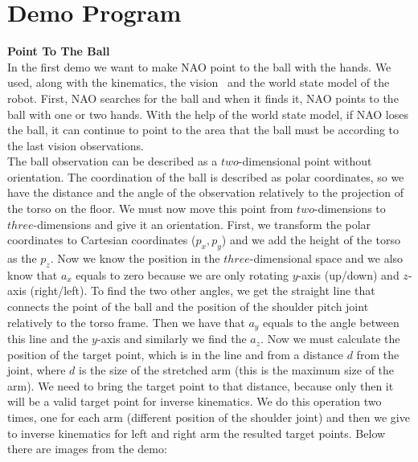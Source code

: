 \section{Demo Program}
\textbf{Point To The Ball}\\
In the first demo we want to make NAO point to the ball with the hands. We used, along with the kinematics, the vision~\cite{orfanoudakis2011} and the world state model of the robot. First, NAO searches for the ball and when it finds it, NAO points to the ball with one or two hands. With the help of the world state model, if NAO loses the ball, it can continue to point to the area that the ball must be according to the last vision observations.\\
The ball observation can be described as a \(two\)-dimensional point without orientation. The coordination of the ball is described as polar coordinates, so we have the distance and the angle of the observation relatively to the projection of the torso on the floor. We must now move this point from \(two\)-dimensions to \(three\)-dimensions and give it an orientation. First, we transform the polar coordinates to Cartesian coordinates ($ p_x,p_y $) and we add the height of the torso as the \(p_z\). Now we know the position in the \(three\)-dimensional space and we also know that \(a_x\) equals to zero because we are only rotating \(y\)-axis (up/down) and \(z\)-axis (right/left). To find the two other angles, we get the straight line that connects the point of the ball and the position of the shoulder pitch joint relatively to the torso frame. Then we have that \(a_y\) equals to the angle between this line and the \(y\)-axis and similarly we find the \(a_z\). Now we must calculate the position of the target point, which is in the line and from a distance \(d\) from the joint, where \(d\) is the size of the stretched arm (this is the maximum size of the arm). We need to bring the target point to that distance, because only then it will be a valid target point for inverse kinematics. We do this operation two times, one for each arm (different position of the shoulder joint) and then we give to inverse kinematics for left and right arm the resulted target points. Below there are images from the demo:
